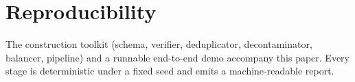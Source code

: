 \documentclass[11pt]{article}
\begin{document}
\section{Reproducibility}
The construction toolkit (schema, verifier, deduplicator, decontaminator,
balancer, pipeline) and a runnable end-to-end demo accompany this paper. Every
stage is deterministic under a fixed seed and emits a machine-readable report.



\end{document}
